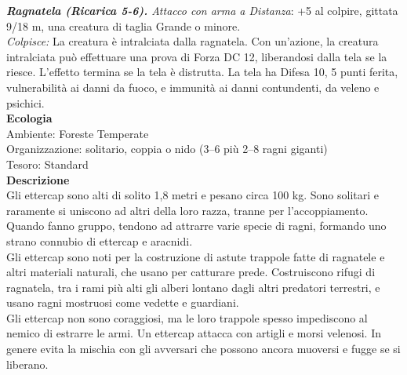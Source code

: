\begin{multicols}{2}
\emph{\textbf{Ragnatela (Ricarica 5-6).} Attacco con arma a Distanza}: +5 al colpire, gittata 9/18 m, una creatura di taglia Grande o minore.\\
\emph{Colpisce:} La creatura è intralciata dalla ragnatela. Con un'azione, la creatura intralciata può effettuare una prova di Forza DC  12, liberandosi dalla tela se la riesce. L'effetto termina se la tela è distrutta. La tela ha Difesa 10, 5 punti ferita, vulnerabilità ai danni da fuoco, e immunità ai danni contundenti, da veleno e psichici.\\
\textbf{Ecologia}\\
Ambiente: Foreste Temperate\\
Organizzazione: solitario, coppia o nido (3–6 più 2–8 ragni giganti)\\
Tesoro: Standard\\
\textbf{Descrizione}\\
Gli ettercap sono alti di solito 1,8 metri e pesano circa 100 kg. Sono solitari e raramente si uniscono ad altri della loro razza, tranne per l'accoppiamento. Quando fanno gruppo, tendono ad attrarre varie specie di ragni, formando uno strano connubio di ettercap e aracnidi.\\
Gli ettercap sono noti per la costruzione di astute trappole fatte di ragnatele e altri materiali naturali, che usano per catturare prede. Costruiscono rifugi di ragnatela, tra i rami più alti gli alberi lontano dagli altri predatori terrestri, e usano ragni mostruosi come vedette e guardiani.\\
Gli ettercap non sono coraggiosi, ma le loro trappole spesso impediscono al nemico di estrarre le armi. Un ettercap attacca con artigli e morsi velenosi. In genere evita la mischia con gli avversari che possono ancora muoversi e fugge se si liberano.\\


\end{multicols}
